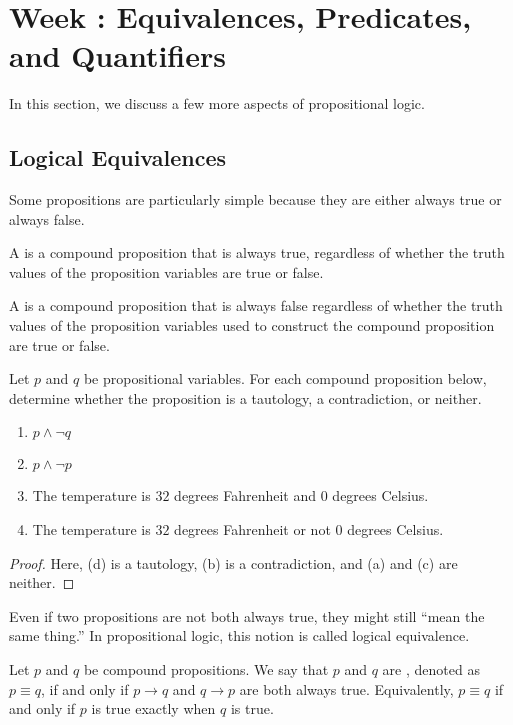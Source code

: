 \documentclass[../notes.tex]{subfiles}
\begin{document}
\section{Week \theweek: Equivalences, Predicates, and Quantifiers }
In this section, we discuss a few more aspects of propositional logic.

\subsection{Logical Equivalences}
Some propositions are particularly simple because they are either always true or always false.
\begin{definition}[tautology]
    A  is a compound proposition that is always true, regardless of whether the truth values of the proposition variables are true or false. 
\end{definition}
\begin{definition}[contradiction]
    A  is a compound proposition that is always false regardless of whether the truth values of the proposition variables used to construct the compound proposition are true or false.
\end{definition}
\begin{example}
    Let $p$ and $q$ be propositional variables. For each compound proposition below, determine whether the proposition is a tautology, a contradiction, or neither. 
    \begin{enumerate}[label=(\alph*)]
        \item $p \land \neg q$
        \item $p \land \neg p$
        \item The temperature is $32$ degrees Fahrenheit and $0$ degrees Celsius.
        \item The temperature is $32$ degrees Fahrenheit or not $0$ degrees Celsius.
    \end{enumerate}
\end{example}
\begin{proof}
    Here, (d) is a tautology, (b) is a contradiction, and (a) and (c) are neither.
\end{proof}
Even if two propositions are not both always true, they might still ``mean the same thing.'' In propositional logic, this notion is called logical equivalence.
\begin{definition}
    Let $p$ and $q$ be compound propositions. We say that $p$ and $q$ are , denoted as $p \equiv q$, if and only if $p \rightarrow q$ and $q \rightarrow p$ are both always true. Equivalently, $p\equiv q$ if and only if $p$ is true exactly when $q$ is true.
\end{definition}
\end{document}
